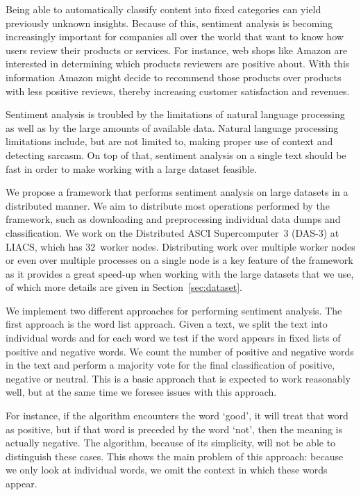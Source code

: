 \documentclass{article}
\begin{document}
Being able to automatically classify content into fixed categories can yield
previously unknown insights. Because of this, sentiment analysis is becoming
increasingly important for companies all over the world that want to know how
users review their products or services. For instance, web shops like Amazon
are interested in determining which products reviewers are positive about.
With this information Amazon might decide to recommend those products over
products with less positive reviews, thereby increasing customer satisfaction
and revenues.

Sentiment analysis is troubled by the limitations of natural language processing
as well as by the large amounts of available data. Natural language processing
limitations include, but are not limited to, making proper use of context and
detecting sarcasm. On top of that, sentiment analysis on a single text should be
fast in order to make working with a large dataset feasible.

We propose a framework that performs sentiment analysis on large datasets in a
distributed manner. We aim to distribute most operations performed by the 
framework, such as downloading and preprocessing individual data dumps and
classification. We work on the Distributed ASCI Supercomputer~3 (DAS-3) at
LIACS, which has 32~worker nodes. Distributing work over multiple worker nodes
or even over multiple processes on a single node is a key feature of the
framework as it provides a great speed-up when working with the large
datasets that we use, of which more details are given in
Section~\ref{sec:dataset}.

We implement two different approaches for performing sentiment analysis. The
first approach is the word list approach. Given a text, we split the text into
individual words and for each word we test if the word appears in fixed lists
of positive and negative words. We count the number of positive and negative
words in the text and perform a majority vote for the final classification
of positive, negative or neutral. This is a basic approach that is expected to
work reasonably well, but at the same time we foresee issues with this 
approach.

For instance, if the algorithm encounters the word `good', it will treat that
word as positive, but if that word is preceded by the word `not', then the
meaning is actually negative. The algorithm, because of its simplicity, will
not be able to distinguish these cases. This shows the main problem of this
approach: because we only look at individual words, we omit the context in
which these words appear.
\end{document}
